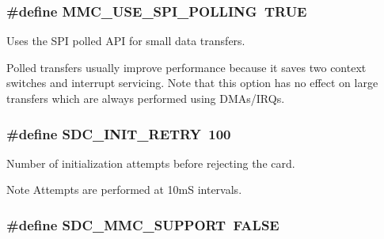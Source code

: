 \subsubsection[{M\+M\+C\+\_\+\+U\+S\+E\+\_\+\+S\+P\+I\+\_\+\+P\+O\+L\+L\+I\+N\+G}]{\setlength{\rightskip}{0pt plus 5cm}\#define M\+M\+C\+\_\+\+U\+S\+E\+\_\+\+S\+P\+I\+\_\+\+P\+O\+L\+L\+I\+N\+G~T\+R\+U\+E}\label{group___h_a_l___c_o_n_f_ga463aaf38dda5f44ab579ddab0a1cf104}


Uses the S\+P\+I polled A\+P\+I for small data transfers. 

Polled transfers usually improve performance because it saves two context switches and interrupt servicing. Note that this option has no effect on large transfers which are always performed using D\+M\+As/\+I\+R\+Qs. \hypertarget{group___h_a_l___c_o_n_f_ga8d39f0c9799062f0698d97c26e6fa42d}{}
\subsubsection[{S\+D\+C\+\_\+\+I\+N\+I\+T\+\_\+\+R\+E\+T\+R\+Y}]{\setlength{\rightskip}{0pt plus 5cm}\#define S\+D\+C\+\_\+\+I\+N\+I\+T\+\_\+\+R\+E\+T\+R\+Y~100}\label{group___h_a_l___c_o_n_f_ga8d39f0c9799062f0698d97c26e6fa42d}


Number of initialization attempts before rejecting the card. 

\begin{DoxyNote}{Note}
Attempts are performed at 10m\+S intervals. 
\end{DoxyNote}
\hypertarget{group___h_a_l___c_o_n_f_ga4f938eff7370feb8de8411e255d21b01}{}
\subsubsection[{S\+D\+C\+\_\+\+M\+M\+C\+\_\+\+S\+U\+P\+P\+O\+R\+T}]{\setlength{\rightskip}{0pt plus 5cm}\#define S\+D\+C\+\_\+\+M\+M\+C\+\_\+\+S\+U\+P\+P\+O\+R\+T~F\+A\+L\+S\+E}\label{group___h_a_l___c_o_n_f_ga4f938eff7370feb8de8411e255d21b01}


